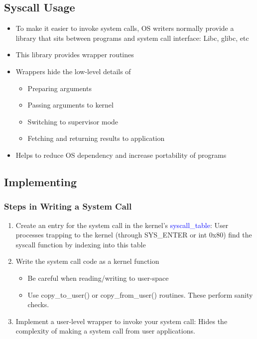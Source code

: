 \documentclass[12pt]{article}
\begin{document}
\subsection{Syscall Usage}
\begin{itemize}
    \item To make it easier to invoke system calls, OS writers normally provide a library that sits between programs and system call interface: Libc, glibc, etc 
    \item This library provides wrapper routines
    \item Wrappers hide the low-level details of \begin{itemize}
        \item Preparing arguments
        \item Passing arguments to kernel 
        \item Switching to supervisor mode
        \item Fetching and returning results to application
    \end{itemize}
    \item Helps to reduce OS dependency and increase portability of programs
\end{itemize}
\subsection{Implementing}
\subsubsection{Steps in Writing a System Call}
\begin{enumerate}
    \item Create an entry for the system call in the kernel’s \textcolor{blue}{syscall\_table}: User processes trapping to the kernel (through SYS\_ENTER or int 0x80) find the syscall function by indexing into this table
    \item Write the system call code as a kernel function \begin{itemize}
        \item Be careful when reading/writing to user-space
        \item Use copy\_to\_user() or copy\_from\_user() routines. These perform sanity checks.
    \end{itemize}
    \item Implement a user-level wrapper to invoke your system call: Hides the complexity of making a system call from user applications.
\end{enumerate}
\end{document}

